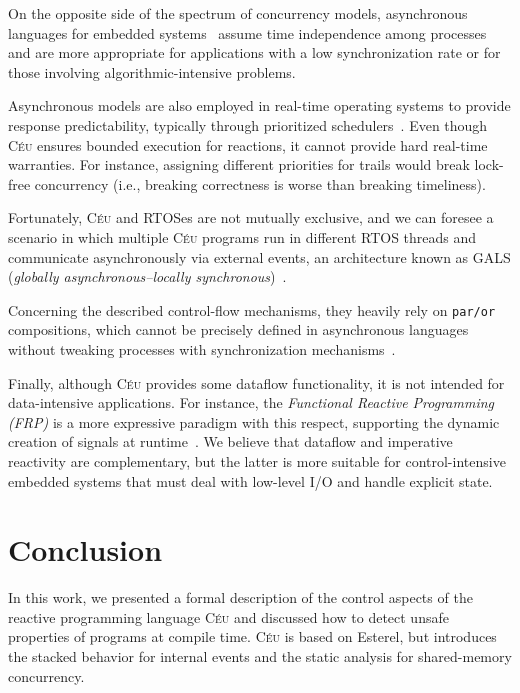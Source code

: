 \documentclass[preprint]{sigplanconf}
\newcommand{\CEU}{\textsc{C\'{e}u}\xspace}
\newcommand{\code}[1] {{\small{\texttt{#1}}}}
\newcommand{\1}{\;}
\newcommand{\2}{\;\;}
\newcommand{\3}{\;\;\;}
\newcommand{\5}{\;\;\;\;\;}
\begin{document}
On the opposite side of the spectrum of concurrency models, asynchronous 
languages for embedded systems~\cite{wsn.mantisos,arduino.occam}
assume time independence among processes and are more appropriate for 
applications with a low synchronization rate or for those involving
algorithmic-intensive problems.

Asynchronous models are also employed in real-time operating systems to provide 
response predictability, typically through prioritized 
schedulers~\cite{wsn.mantisos,wsn.oses,freertos}.
Even though \CEU ensures bounded execution for reactions, it cannot provide 
hard real-time warranties.
For instance, assigning different priorities for trails would break lock-free 
concurrency (i.e., breaking correctness is worse than breaking timeliness).

Fortunately, \CEU and RTOSes are not mutually exclusive, and we can foresee a 
scenario in which multiple \CEU programs run in different RTOS threads and 
communicate asynchronously via external events, an architecture known as GALS 
(\emph{globally asynchronous--locally synchronous})~\cite{rp.gals}.

Concerning the described control-flow mechanisms, they heavily rely on 
\code{par/or} compositions, which cannot be precisely defined in asynchronous 
languages without tweaking processes with synchronization 
mechanisms~\cite{esterel.preemption}.

Finally, although \CEU provides some dataflow functionality, it is not intended 
for data-intensive applications.
For instance, the \emph{Functional Reactive Programming (FRP)} is a more 
expressive paradigm with this respect, supporting the dynamic creation of 
signals at runtime~\cite{frp.principles}.
We believe that dataflow and imperative reactivity are complementary, but the 
latter is more suitable for control-intensive embedded systems that must deal 
with low-level I/O and handle explicit state.

\section{Conclusion}
\label{sec.conclusion}

In this work, we presented a formal description of the control aspects of the 
reactive programming language \CEU and discussed how to detect unsafe 
properties of programs at compile time.
\CEU is based on Esterel, but introduces the stacked behavior for internal 
events and the static analysis for shared-memory concurrency.
\end{document}
